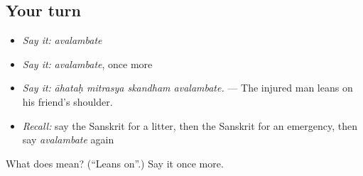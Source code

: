 \subsection*{Your turn}
\begin{itemize}
\raggedright
  \item \emph{Say it:} \emph{avalambate}
  \item \emph{Say it:} \emph{avalambate}, once more
  \item \emph{Say it:} \emph{āhataḥ mitrasya skandham avalambate.} — The injured man leans on his friend's shoulder.
  \item \emph{Recall:} say the Sanskrit for a litter, then the Sanskrit for an emergency, then say \emph{avalambate} again
\end{itemize}

\begin{tcolorbox}[breakable,colback=teal!4,colframe=teal!35!black,title={Before you move on}]
What does  mean? (\textquotedblleft{}Leans on\textquotedblright{}.) Say it once more.
\end{tcolorbox}
